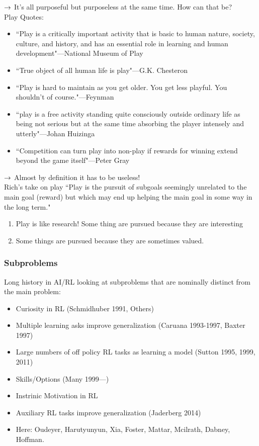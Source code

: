 $\rightarrow$ It's all purposeful but purposeless at the same time. How can that be? \\

Play Quotes:
\begin{itemize}
    \item ``Play is a critically important activity that is basic to human nature, society, culture, and history, and has an essential role in learning and human development"---National Museum of Play
    
    \item ``True object of all human life is play"---G.K. Chesteron
    \item ``Play is hard to maintain as you get older. You get less playful. You shouldn't of course."---Feynman
    
    \item ``play is a free activity standing quite consciously outside ordinary life as being not serious but at the same time absorbing the player intensely and utterly"---Johan Huizinga
    
    \item ``Competition can turn play into non-play if rewards for winning extend beyond the game itself"---Peter Gray
\end{itemize}

$\rightarrow$ Almost by definition it has to be useless! \\

Rich's take on play ``Play is the pursuit of subgoals seemingly unrelated to the main goal (reward) but which may end up helping the main goal in some way in the long term."
\begin{enumerate}
    \item Play is like research! Some thing are pursued because they are interesting
    \item Some things are pursued because they are sometimes valued.
\end{enumerate}

\subsubsection{Subproblems}

Long history in AI/RL looking at subproblems that are nominally distinct from the main problem:
\begin{itemize}
    \item Curiosity in RL (Schmidhuber 1991, Others)
    \item Multiple learning asks improve generalization (Caruana 1993-1997, Baxter 1997)
    \item Large numbers of off policy RL tasks as learning a model (Sutton 1995, 1999, 2011)
    \item Skills/Options (Many 1999---)
    \item Instrinic Motivation in RL
    \item Auxiliary RL tasks improve generalization (Jaderberg 2014)
    \item Here: Oudeyer, Harutyunyun, Xia, Foster, Mattar, Mcilrath, Dabney, Hoffman.
\end{itemize}

